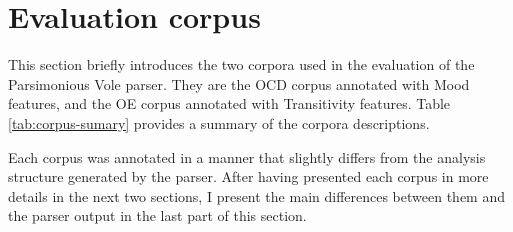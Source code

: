 \section{Evaluation corpus}
\label{sec:corpus}
    
    This section briefly introduces the two corpora used in the evaluation of the Parsimonious Vole parser. They are the OCD corpus annotated with Mood  features, and the OE corpus annotated with Transitivity features. Table \ref{tab:corpus-sumary} provides a summary of the corpora descriptions.  
    
    \begin{table}[!ht]
        \centering
        \caption{Evaluation corpus summary}
        \label{tab:corpus-sumary}
    \end{table}
    
    Each corpus was annotated in a manner that slightly differs from the analysis structure generated by the parser. After having presented each corpus in more details in the next two sections, I present the main differences between them and the parser output in the last part of this section. 
    

